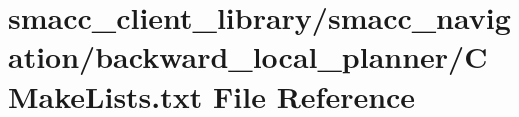 \hypertarget{client__library_2smacc__navigation_2backward__local__planner_2CMakeLists_8txt}{}\section{smacc\+\_\+client\+\_\+library/smacc\+\_\+navigation/backward\+\_\+local\+\_\+planner/\+C\+Make\+Lists.txt File Reference}
\label{client__library_2smacc__navigation_2backward__local__planner_2CMakeLists_8txt}
